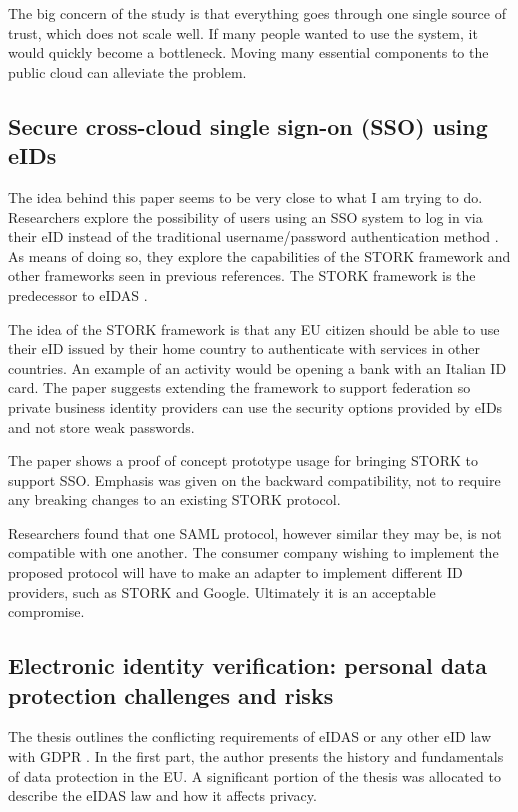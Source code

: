The big concern of the study is that everything goes through one single source of trust, which does not scale well. If many people wanted to use the system, it would quickly become a bottleneck. Moving many essential components to the public cloud can alleviate the problem.

\subsection{Secure cross-cloud single sign-on (SSO) using eIDs}

The idea behind this paper seems to be very close to what I am trying to do. Researchers explore the possibility of users using an SSO system to log in via their eID instead of the traditional username/password authentication method \cite{secure-signon}. As means of doing so, they explore the capabilities of the STORK framework and other frameworks seen in previous references. The STORK framework is the predecessor to eIDAS \cite{stork}.

The idea of the STORK framework is that any EU citizen should be able to use their eID issued by their home country to authenticate with services in other countries. An example of an activity would be opening a bank with an Italian ID card. The paper suggests extending the framework to support federation so private business identity providers can use the security options provided by eIDs and not store weak passwords.

The paper shows a proof of concept prototype usage for bringing STORK to support SSO. Emphasis was given on the backward compatibility, not to require any breaking changes to an existing STORK protocol.

Researchers found that one SAML protocol, however similar they may be, is not compatible with one another. The consumer company wishing to implement the proposed protocol will have to make an adapter to implement different ID providers, such as STORK and Google. Ultimately it is an acceptable compromise.

\subsection{Electronic identity verification: personal data protection challenges and risks}

The thesis outlines the conflicting requirements of eIDAS or any other eID law with GDPR \cite{gdpr-thesis}. In the first part, the author presents the history and fundamentals of data protection in the EU. A significant portion of the thesis was allocated to describe the eIDAS law and how it affects privacy.

